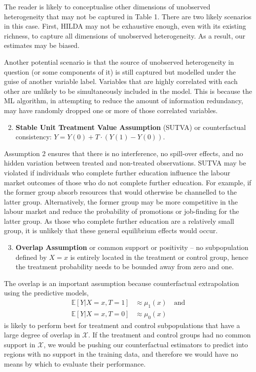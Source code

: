 \documentclass[12pt, a4paper]{article}
\begin{document}
The reader is likely to conceptualise other dimensions of unobserved heterogeneity that may not be captured in Table 1. There are two likely scenarios in this case. First, HILDA may not be exhaustive enough, even with its existing richness, to capture all dimensions of unobserved heterogeneity. As a result, our estimates may be biased. 

Another potential scenario is that the source of unobserved heterogeneity in question (or some components of it) is still captured but modelled under the guise of another variable label. Variables that are highly correlated with each other are unlikely to be simultaneously included in the model. This is because the ML algorithm, in attempting to reduce the amount of information redundancy, may have randomly dropped one or more of those correlated variables. 

\begin{enumerate}
  \setcounter{enumi}{1}

  \item \textbf{Stable Unit Treatment Value Assumption} (SUTVA) or
    counterfactual consistency: $Y = Y(0) + T \cdot (Y(1) - Y(0))$. 

\end{enumerate}  

Assumption 2 ensures that there is no interference, no spill-over effects, and no hidden variation between treated and non-treated observations. SUTVA may be violated if individuals who complete further education influence the labour market outcomes of those who do not complete further education. For example, if the former group absorb resources that would otherwise be channelled to the latter group. Alternatively, the former group may be more competitive in the labour market and reduce the probability of promotions or job-finding for the latter group. As those who complete further education are a relatively small group, it is unlikely that these general equilibrium effects would occur. 

\begin{enumerate}
  \setcounter{enumi}{2}
  \item \textbf{Overlap Assumption} or common support or positivity -- no
    subpopulation defined by $X = x$ is entirely located in the treatment or
    control group, hence the treatment probability needs to be bounded away
    from zero and one.
\end{enumerate}

The overlap is an important assumption because counterfactual extrapolation
using the predictive models, 
\begin{align}
  \mathbb{E}[Y|X{=}x, T{=}1] &\approx \mu_1(x) \quad \textrm{and} \label{eq:T1} \\
  \mathbb{E}[Y|X{=}x, T{=}0] &\approx \mu_0(x) \label{eq:T0}
\end{align}
is likely to perform best for treatment and control subpopulations that have a
large degree of overlap in $\mathcal{X}$. If the treatment and control groups
had no common support in $\mathcal{X}$, we would be pushing our counterfactual
estimators to predict into regions with no support in the training data, and
therefore we would have no means by which to evaluate their performance.
\end{document}
